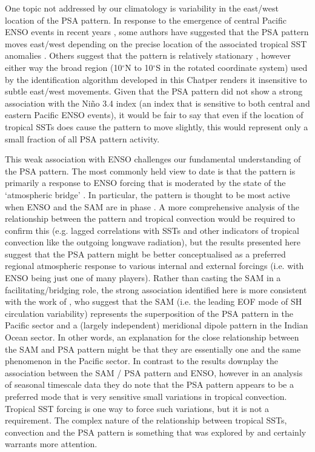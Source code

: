 One topic not addressed by our climatology is variability in the east/west location of the PSA pattern. In response to the emergence of central Pacific ENSO events in recent years \citep[e.g.][]{Ashok2007}, some authors have suggested that the PSA pattern moves east/west depending on the precise location of the associated tropical SST anomalies \citep[e.g.][]{Sun2013,WilsonBromwich2014,Ciasto2015}. Others suggest that the pattern is relatively stationary \citep[e.g.][]{Liu2007,Ding2012}, however either way the broad region (10$^{\circ}$N to 10$^{\circ}$S in the rotated coordinate system) used by the identification algorithm developed in this Chatper renders it insensitive to subtle east/west movements. Given that the PSA pattern did not show a strong association with the Ni\~{n}o 3.4 index (an index that is sensitive to both central and eastern Pacific ENSO events), it would be fair to say that even if the location of tropical SSTs does cause the pattern to move slightly, this would represent only a small fraction of all PSA pattern activity. 

This weak association with ENSO challenges our fundamental understanding of the PSA pattern. The most commonly held view to date is that the pattern is primarily a response to ENSO forcing \citep[e.g.][]{Mo2001} that is moderated by the state of the `atmospheric bridge' \citep{Liu2007}. In particular, the pattern is thought to be most active when ENSO and the SAM are in phase \citep{Fogt2006}. A more comprehensive analysis of the relationship between the pattern and tropical convection would be required to confirm this (e.g. lagged correlations with SSTs and other indicators of tropical convection like the outgoing longwave radiation), but the results presented here suggest that the PSA pattern might be better conceptualised as a preferred regional atmospheric response to various internal and external forcings (i.e. with ENSO being just one of many players). Rather than casting the SAM in a facilitating/bridging role, the strong association identified here is more consistent with the work of \citet{Ding2012}, who suggest that the SAM (i.e. the leading EOF mode of SH circulation variability) represents the superposition of the PSA pattern in the Pacific sector and a (largely independent) meridional dipole pattern in the Indian Ocean sector. In other words, an explanation for the close relationship between the SAM and PSA pattern might be that they are essentially one and the same phenomenon in the Pacific sector. In contrast to \citet{Ding2012} the results downplay the association between the SAM / PSA pattern and ENSO, however in an analysis of seasonal timescale data they do note that the PSA pattern appears to be a preferred mode that is very sensitive small variations in tropical convection. Tropical SST forcing is one way to force such variations, but it is not a requirement. The complex nature of the relationship between tropical SSTs, convection and the PSA pattern is something that was explored by \citet{Harangozo2004} and certainly warrants more attention.  

